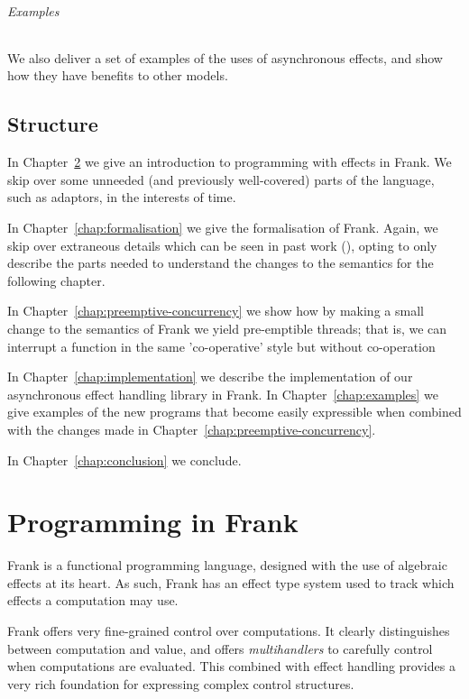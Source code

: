 \documentclass[msc,deptreport,cs]{infthesis} %
\begin{document}
\subparagraph*{Examples} We also deliver a set of examples of the uses of
asynchronous effects, and show how they have benefits to other models.

\section{Structure}

In Chapter~\ref{chap:programming-in-frank} we give an introduction to
programming with effects in Frank. We skip over some unneeded (and previously
well-covered) parts of the language, such as adaptors, in the interests of time.

In Chapter~\ref{chap:formalisation} we give the formalisation of Frank. Again,
we skip over extraneous details which can be seen in past work
(\cite{convent2020doo}), opting to only describe the parts needed to understand
the changes to the semantics for the following chapter.

In Chapter~\ref{chap:preemptive-concurrency} we show how by making a small
change to the semantics of Frank we yield pre-emptible threads; that is, we can
interrupt a function in the same 'co-operative' style but without co-operation

In Chapter~\ref{chap:implementation} we describe the implementation of our
asynchronous effect handling library in Frank. In Chapter~\ref{chap:examples} we
give examples of the new programs that become easily expressible when combined
with the changes made in Chapter~\ref{chap:preemptive-concurrency}.

In Chapter~\ref{chap:conclusion} we conclude.






\chapter{Programming in Frank}
\label{chap:programming-in-frank}

Frank is a functional programming language, designed with the use of algebraic
effects at its heart. As such, Frank has an effect type system used to track
which effects a computation may use.

Frank offers very fine-grained control over computations. It clearly
distinguishes between computation and value, and offers \emph{multihandlers} to
carefully control when computations are evaluated. This combined with effect
handling provides a very rich foundation for expressing complex control
structures.
\end{document}
